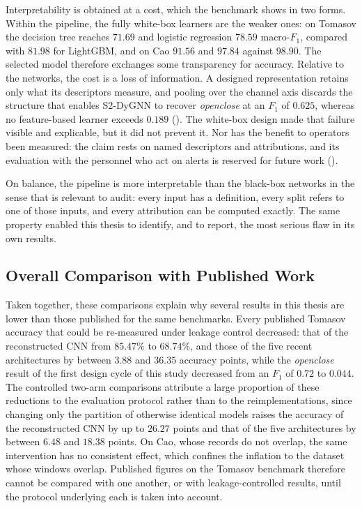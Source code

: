 Interpretability is obtained at a cost, which the benchmark shows in two forms. Within the pipeline, the fully white-box learners are the weaker ones: on Tomasov the decision tree reaches $71.69$ and logistic regression $78.59$ macro-$F_1$, compared with $81.98$ for LightGBM, and on Cao $91.56$ and $97.84$ against $98.90$. The selected model therefore exchanges some transparency for accuracy. Relative to the networks, the cost is a loss of information. A designed representation retains only what its descriptors measure, and pooling over the channel axis discards the structure that enables S2-DyGNN to recover \emph{openclose} at an $F_1$ of $0.625$, whereas no feature-based learner exceeds $0.189$ (). The white-box design made that failure visible and explicable, but it did not prevent it. Nor has the benefit to operators been measured: the claim rests on named descriptors and attributions, and its evaluation with the personnel who act on alerts is reserved for future work ().

On balance, the pipeline is more interpretable than the black-box networks in the sense that is relevant to audit: every input has a definition, every split refers to one of those inputs, and every attribution can be computed exactly. The same property enabled this thesis to identify, and to report, the most serious flaw in its own results.

\subsection{Overall Comparison with Published Work}
\label{sec:resSynthesis}
Taken together, these comparisons explain why several results in this thesis are lower than those published for the same benchmarks. Every published Tomasov accuracy that could be re-measured under leakage control decreased: that of the reconstructed CNN from $85.47\%$ to $68.74\%$, and those of the five recent architectures by between $3.88$ and $36.35$ accuracy points, while the \emph{openclose} result of the first design cycle of this study decreased from an $F_1$ of $0.72$ to $0.044$. The controlled two-arm comparisons attribute a large proportion of these reductions to the evaluation protocol rather than to the reimplementations, since changing only the partition of otherwise identical models raises the accuracy of the reconstructed CNN by up to $26.27$ points and that of the five architectures by between $6.48$ and $18.38$ points. On Cao, whose records do not overlap, the same intervention has no consistent effect, which confines the inflation to the dataset whose windows overlap. Published figures on the Tomasov benchmark therefore cannot be compared with one another, or with leakage-controlled results, until the protocol underlying each is taken into account.

